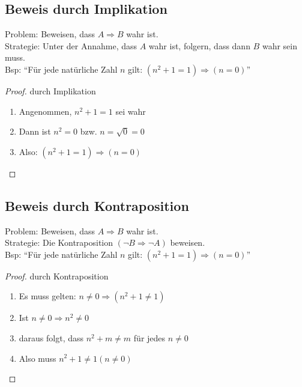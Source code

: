 \subsection{Beweis durch Implikation}
Problem: Beweisen, dass $A \Rightarrow B$ wahr ist.\\
Strategie: Unter der Annahme, dass $A$ wahr ist, folgern, dass dann $B$ wahr sein muss.\\
Bsp: \enquote{Für jede natürliche Zahl $n$ gilt: $(n^2 + 1 = 1) \Rightarrow (n = 0)$}\\
\begin{proof}
durch Implikation
\begin{enumerate}\itemsep0em
	\item Angenommen, $n^2 + 1 = 1$ sei wahr
	\item Dann ist $n^2 = 0$ bzw. $n = \sqrt{0} = 0$
	\item Also: $(n^2 + 1 = 1) \Rightarrow (n = 0)$\qedhere
\end{enumerate}
\end{proof}

\subsection{Beweis durch Kontraposition}
Problem: Beweisen, dass $A \Rightarrow B$ wahr ist.\\
Strategie: Die Kontraposition $(\neg B \Rightarrow \neg A)$ beweisen.\\
Bsp: \enquote{Für jede natürliche Zahl $n$ gilt: $(n^2 + 1 = 1) \Rightarrow (n = 0)$}\\
\begin{proof}
durch Kontraposition
\begin{enumerate}\itemsep0em
	\item Es muss gelten: $n \neq 0 \Rightarrow (n^2 + 1 \neq 1)$
	\item Ist $n \neq 0 \Rightarrow n^2 \neq 0$
	\item daraus folgt, dass $n^2 + m \neq m$ für jedes $n \neq 0$
	\item Also muss $n^2 + 1 \neq 1 (n \neq 0)$\qedhere
\end{enumerate}
\end{proof}

